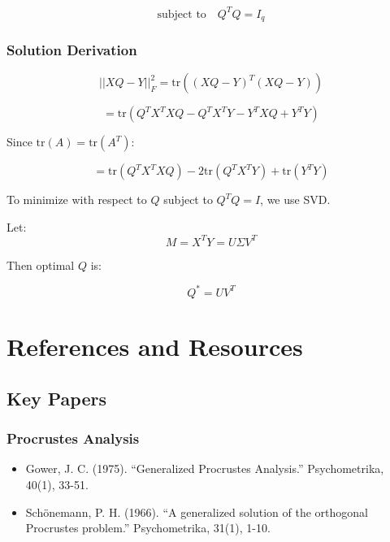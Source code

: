 \documentclass[12pt,a4paper,oneside]{report}
\begin{document}
\begin{equation}
\text{subject to} \quad Q^T Q = I_q
\end{equation}

\subsection{Solution Derivation}

\begin{equation}
||XQ - Y||_F^2 = \text{tr}((XQ-Y)^T(XQ-Y))
\end{equation}

\begin{equation}
= \text{tr}(Q^T X^T X Q - Q^T X^T Y - Y^T X Q + Y^T Y)
\end{equation}

Since $\text{tr}(A) = \text{tr}(A^T)$:

\begin{equation}
= \text{tr}(Q^T X^T X Q) - 2\text{tr}(Q^T X^T Y) + \text{tr}(Y^T Y)
\end{equation}

To minimize with respect to $Q$ subject to $Q^T Q = I$, we use SVD.

Let:
\begin{equation}
M = X^T Y = U \Sigma V^T
\end{equation}

Then optimal $Q$ is:

\begin{equation}
Q^* = U V^T
\end{equation}

\chapter{References and Resources}

\section{Key Papers}

\subsection{Procrustes Analysis}
\begin{itemize}
    \item Gower, J. C. (1975). ``Generalized Procrustes Analysis.'' Psychometrika, 40(1), 33-51.
    \item Schönemann, P. H. (1966). ``A generalized solution of the orthogonal Procrustes problem.'' Psychometrika, 31(1), 1-10.
\end{itemize}
\end{document}
